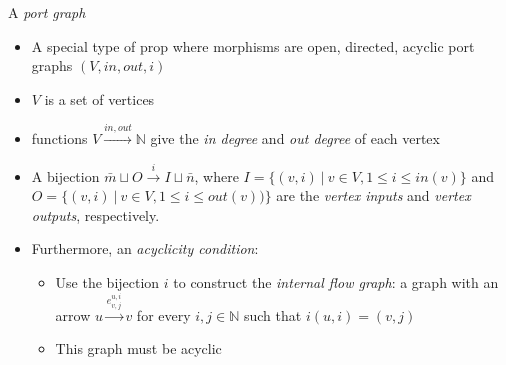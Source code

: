 
A \emph{port graph}

\begin{itemize}
    \item A special type of prop where morphisms are open, directed, acyclic port graphs $(V, in, out, i)$
    \item $V$ is a set of vertices
    \item functions $V \xrightarrow{in, out} \mathbb{N}$ give the \emph{in degree} and \emph{out degree} of each vertex
    \item A bijection $\bar m \sqcup O \xrightarrow{i} I \sqcup \bar n$, where $I = \{(v,i)\ |\ v \in V, 1 \leq i \leq in(v)\}$ and $O=\{(v,i)\ |\ v \in V, 1 \leq i \leq out(v))\}$ are the \emph{vertex inputs} and \emph{vertex outputs}, respectively.
    \item Furthermore, an \emph{acyclicity condition}:
          \begin{itemize}
            \item Use the bijection $i$ to construct the \emph{internal flow graph}: a graph with an arrow $u \xrightarrow{e^{u,i}_{v,j}} v$ for every $i,j \in \mathbb{N}$ such that $i(u,i)=(v,j)$
            \item This graph must be acyclic
          \end{itemize}
  \end{itemize}
